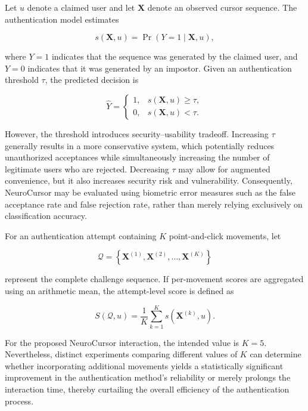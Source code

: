 \documentclass[conference]{IEEEtran}
\begin{document}
Let $u$ denote a claimed user and let $\mathbf{X}$ denote an observed cursor sequence. The authentication model estimates 

\begin{equation}
s(\mathbf{X},u)
=
\Pr(Y=1 \mid \mathbf{X},u), 
\label{eq:auth_probability}
\end{equation}

where $Y=1$ indicates that the sequence was generated by the claimed user, and $Y=0$ indicates that it was generated by an impostor. Given an authentication threshold $\tau$, the predicted decision is 

\begin{equation}
\widehat{Y}
=
\begin{cases}
1, & s(\mathbf{X}, u) \geq \tau,\\
0, & s(\mathbf{X}, u) < \tau.
\end{cases}
\label{eq:threshold_decision}
\end{equation}

However, the threshold introduces security--usability tradeoff. Increasing $\tau$ generally results in a more conservative system, which potentially reduces unauthorized acceptances while simultaneously increasing the number of legitimate users who are rejected. Decreasing $\tau$ may allow for augmented convenience, but it also increases security risk and vulnerability. Consequently, NeuroCursor may be evaluated using biometric error measures such as the false acceptance rate and false rejection rate, rather than merely relying exclusively on classification accuracy. 

For an authentication attempt containing $K$ point-and-click movements, let

\begin{equation}
\mathcal{Q}
=
\left\{
\mathbf{X}^{(1)},
\mathbf{X}^{(2)},
\ldots,
\mathbf{X}^{(K)}
\right\}
\label{eq:challenge_set}
\end{equation}

represent the complete challenge sequence. If per-movement scores are aggregated using an arithmetic mean, the attempt-level score is defined as  

\begin{equation}
S(\mathcal{Q},u)
=
\frac{1}{K}
\sum_{k=1}^K
s\left(\mathbf{X}^{(k)},u\right).
\label{eq:aggregate_score}
\end{equation}

For the proposed NeuroCursor interaction, the intended value is $K=5$. Nevertheless, distinct experiments comparing different values of $K$ can determine whether incorporating additional movements yields a statistically significant improvement in the authentication method's reliability or merely prolongs the interaction time, thereby curtailing the overall efficiency of the authentication process. 
\end{document}

